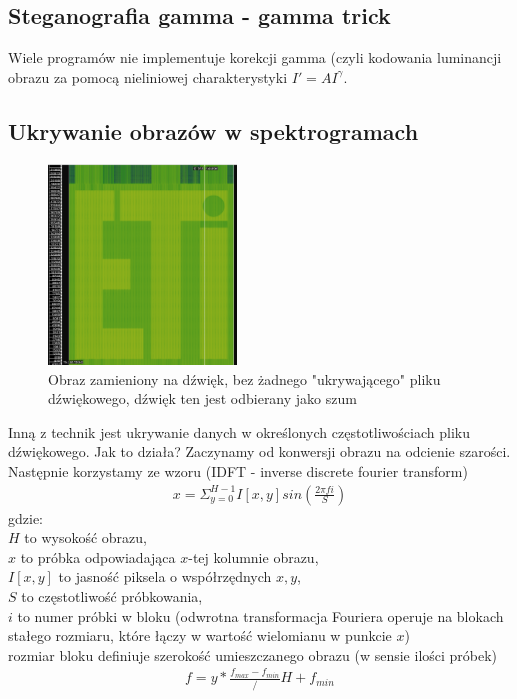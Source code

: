 \documentclass{article}
\begin{document}
\subsection{Steganografia gamma - gamma trick}
Wiele programów nie implementuje korekcji gamma (czyli kodowania luminancji obrazu za pomocą nieliniowej charakterystyki $I' = AI^{\gamma}$.


\subsection{Ukrywanie obrazów w spektrogramach}
\begin{figure}[H]
	\centering
	\includegraphics[width=5cm]{samobraz}
	\caption{Obraz zamieniony na dźwięk, bez żadnego "ukrywającego" pliku dźwiękowego, dźwięk
	ten jest odbierany jako szum}
\end{figure}
Inną z technik jest ukrywanie danych w określonych częstotliwościach pliku dźwiękowego.
Jak to działa? Zaczynamy od konwersji obrazu na odcienie szarości.
Następnie korzystamy ze wzoru (IDFT - inverse discrete fourier transform)
\begin{gather*}
	x = \Sigma_{y=0}^{H-1}I[x,y]sin(\frac{2\pi f i}{S})
\end{gather*}
gdzie: \\ 
$H$ to wysokość obrazu, \\
$x$ to próbka odpowiadająca $x$-tej kolumnie obrazu,\\
$I[x,y]$ to jasność piksela o współrzędnych $x,y$, \\
$S$ to częstotliwość próbkowania, \\
$i$ to numer próbki w bloku (odwrotna transformacja Fouriera operuje na blokach stałego rozmiaru,
które łączy w wartość wielomianu w punkcie $x$) \\
rozmiar bloku definiuje szerokość umieszczanego obrazu (w sensie ilości próbek) 
\begin{gather*}
 f = y * \frac{f_{max} - f_{min}}/H + f_{min} 
\end{gather*}
\end{document}
